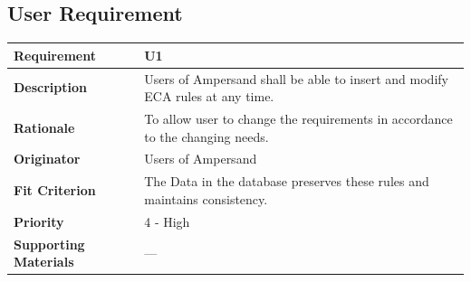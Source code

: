 \documentclass[12pt]{report}
\begin{document}



\subsection{User Requirement}

{\setlength{\tabcolsep}{12pt} %
\begin{tabularx}{\textwidth}{>{\bfseries}m{3cm}X}
Requirement & U1 \\ 
\midrule
\endhead
Description  & Users of Ampersand shall be able to insert and 
modify ECA rules at any time.  
\\	Rationale & To allow user to change the requirements in accordance to the changing needs.
\\	Originator & Users of Ampersand
\\	Fit Criterion & The Data in the database preserves these rules and maintains consistency.   
\\	Priority & 4 - High
\\	Supporting Materials & --- 
\vspace{12pt}
\end{tabularx}
}
\end{document}
